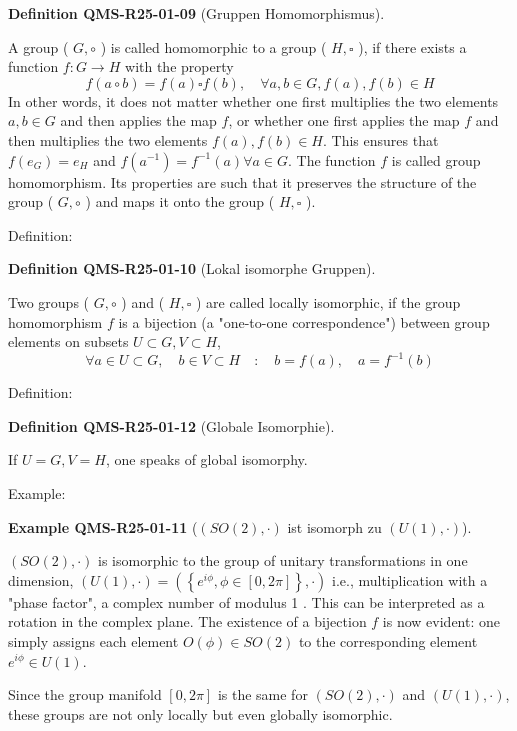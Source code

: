 \documentclass[10pt, letterpaper]{article}
\newcommand{\CustomHeading}[3]{%
  \par\medskip\noindent%
  \textbf{#1 #2} \textnormal{(#3)}.\enskip%
}
\newenvironment{DEF}[2]{\begin{unitbox}\CustomHeading{Definition}{#1}{#2}}{\end{unitbox}}
\newenvironment{EXA}[2]{\begin{unitbox}\CustomHeading{Example}{#1}{#2}}{\end{unitbox}}
\begin{document}
\begin{DEF}{QMS-R25-01-09}{Gruppen Homomorphismus}
A group ( $G, \circ$ ) is called homomorphic to a group ( $H, \square$ ), if there exists a function $f: G \rightarrow H$ with the property
$$
f(a \circ b)=f(a) \square f(b), \quad \forall a, b \in G, f(a), f(b) \in H
$$
In other words, it does not matter whether one first multiplies the two elements $a, b \in G$ and then applies the map $f$, or whether one first applies the map $f$ and then multiplies the two elements $f(a), f(b) \in H$. This ensures that $f\left(e_{G}\right)=e_{H}$ and $f\left(a^{-1}\right)=f^{-1}(a) \forall a \in G$. The function $f$ is called group homomorphism. Its properties are such that it preserves the structure of the group ( $G, \circ$ ) and maps it onto the group ( $H, \square$ ).
\end{DEF}


Definition: 

\begin{DEF}{QMS-R25-01-10}{Lokal isomorphe Gruppen}
Two groups ( $G, \circ$ ) and ( $H, \square$ ) are called locally isomorphic, if the group homomorphism $f$ is a bijection (a "one-to-one correspondence") between group elements on subsets $U \subset G, V \subset H$,
$$
\forall a \in U \subset G, \quad b \in V \subset H \quad: \quad b=f(a), \quad a=f^{-1}(b)
$$
\end{DEF}


Definition: 

\begin{DEF}{QMS-R25-01-12}{Globale Isomorphie}
If $U=G, V=H$, one speaks of global isomorphy.
\end{DEF}


Example: 

\begin{EXA}{QMS-R25-01-11}{$(SO(2), \cdot)$ ist isomorph zu $(U(1), \cdot)$}
$(S O(2), \cdot)$ is isomorphic to the group of unitary transformations in one dimension,
$
(U(1), \cdot)=\left(\left\{e^{i \phi}, \phi \in[0,2 \pi]\right\}, \cdot\right)
$
i.e., multiplication with a "phase factor", a complex number of modulus 1 . This can be interpreted as a rotation in the complex plane. The existence of a bijection $f$ is now evident: one simply assigns each element $O(\phi) \in S O(2)$ to the corresponding element $e^{i \phi} \in U(1)$.

Since the group manifold $[0,2 \pi]$ is the same for $(S O(2), \cdot)$ and $(U(1), \cdot)$, these groups are not only locally but even globally isomorphic.
\end{EXA}
\end{document}
